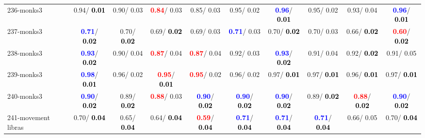 \begin{table}[h]
\begin{center}
{\begin{tabular}{lc|c|c|c|c|c|c|c|c}
236-monks3 &   0.94/\textcolor{black}{\textbf{  0.01}} &   0.90/  0.03 & \textcolor{red}{\textbf{  0.84}}/  0.03 &   0.85/  0.03 &   0.95/  0.02 & \textcolor{blue}{\textbf{  0.96}}/\textcolor{black}{\textbf{  0.01}} &   0.95/  0.02 &   0.93/  0.04 & \textcolor{blue}{\textbf{  0.96}}/\textcolor{black}{\textbf{  0.01}} \\
237-monks3 & \textcolor{blue}{\textbf{  0.71}}/\textcolor{black}{\textbf{  0.02}} &   0.70/\textcolor{black}{\textbf{  0.02}} &   0.69/\textcolor{black}{\textbf{  0.02}} &   0.69/  0.03 & \textcolor{blue}{\textbf{  0.71}}/  0.03 &   0.70/\textcolor{black}{\textbf{  0.02}} &   0.70/  0.03 &   0.66/\textcolor{black}{\textbf{  0.02}} & \textcolor{red}{\textbf{  0.60}}/\textcolor{black}{\textbf{  0.02}} \\
238-monks3 & \textcolor{blue}{\textbf{  0.93}}/\textcolor{black}{\textbf{  0.02}} &   0.90/  0.04 & \textcolor{red}{\textbf{  0.87}}/  0.04 & \textcolor{red}{\textbf{  0.87}}/  0.04 &   0.92/  0.03 & \textcolor{blue}{\textbf{  0.93}}/\textcolor{black}{\textbf{  0.02}} &   0.91/  0.04 &   0.92/\textcolor{black}{\textbf{  0.02}} &   0.91/  0.05 \\ \hline
239-monks3 & \textcolor{blue}{\textbf{  0.98}}/\textcolor{black}{\textbf{  0.01}} &   0.96/  0.02 & \textcolor{red}{\textbf{  0.95}}/\textcolor{black}{\textbf{  0.01}} & \textcolor{red}{\textbf{  0.95}}/  0.02 &   0.96/  0.02 &   0.97/\textcolor{black}{\textbf{  0.01}} &   0.97/\textcolor{black}{\textbf{  0.01}} &   0.96/\textcolor{black}{\textbf{  0.01}} &   0.97/\textcolor{black}{\textbf{  0.01}} \\
240-monks3 & \textcolor{blue}{\textbf{  0.90}}/\textcolor{black}{\textbf{  0.02}} &   0.89/\textcolor{black}{\textbf{  0.02}} & \textcolor{red}{\textbf{  0.88}}/  0.03 & \textcolor{blue}{\textbf{  0.90}}/\textcolor{black}{\textbf{  0.02}} & \textcolor{blue}{\textbf{  0.90}}/\textcolor{black}{\textbf{  0.02}} & \textcolor{blue}{\textbf{  0.90}}/\textcolor{black}{\textbf{  0.02}} &   0.89/\textcolor{black}{\textbf{  0.02}} & \textcolor{red}{\textbf{  0.88}}/\textcolor{black}{\textbf{  0.02}} & \textcolor{blue}{\textbf{  0.90}}/\textcolor{black}{\textbf{  0.02}} \\
241-movement libras &   0.70/\textcolor{black}{\textbf{  0.04}} &   0.65/\textcolor{black}{\textbf{  0.04}} &   0.64/\textcolor{black}{\textbf{  0.04}} & \textcolor{red}{\textbf{  0.59}}/\textcolor{black}{\textbf{  0.04}} & \textcolor{blue}{\textbf{  0.71}}/\textcolor{black}{\textbf{  0.04}} & \textcolor{blue}{\textbf{  0.71}}/\textcolor{black}{\textbf{  0.04}} & \textcolor{blue}{\textbf{  0.71}}/\textcolor{black}{\textbf{  0.04}} &   0.66/  0.05 &   0.70/\textcolor{black}{\textbf{  0.04}} \\

\end{tabular}}
\end{center}
\end{table}
